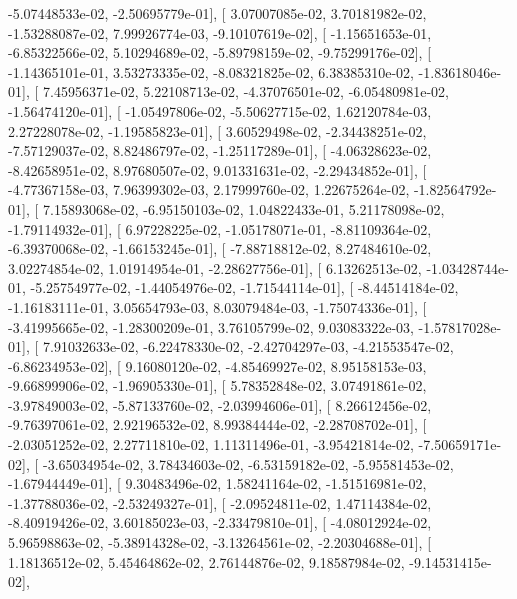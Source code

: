 \documentclass{article}
\begin{document}
         -5.07448533e-02,  -2.50695779e-01],
       [  3.07007085e-02,   3.70181982e-02,  -1.53288087e-02,
          7.99926774e-03,  -9.10107619e-02],
       [ -1.15651653e-01,  -6.85322566e-02,   5.10294689e-02,
         -5.89798159e-02,  -9.75299176e-02],
       [ -1.14365101e-01,   3.53273335e-02,  -8.08321825e-02,
          6.38385310e-02,  -1.83618046e-01],
       [  7.45956371e-02,   5.22108713e-02,  -4.37076501e-02,
         -6.05480981e-02,  -1.56474120e-01],
       [ -1.05497806e-02,  -5.50627715e-02,   1.62120784e-03,
          2.27228078e-02,  -1.19585823e-01],
       [  3.60529498e-02,  -2.34438251e-02,  -7.57129037e-02,
          8.82486797e-02,  -1.25117289e-01],
       [ -4.06328623e-02,  -8.42658951e-02,   8.97680507e-02,
          9.01331631e-02,  -2.29434852e-01],
       [ -4.77367158e-03,   7.96399302e-03,   2.17999760e-02,
          1.22675264e-02,  -1.82564792e-01],
       [  7.15893068e-02,  -6.95150103e-02,   1.04822433e-01,
          5.21178098e-02,  -1.79114932e-01],
       [  6.97228225e-02,  -1.05178071e-01,  -8.81109364e-02,
         -6.39370068e-02,  -1.66153245e-01],
       [ -7.88718812e-02,   8.27484610e-02,   3.02274854e-02,
          1.01914954e-01,  -2.28627756e-01],
       [  6.13262513e-02,  -1.03428744e-01,  -5.25754977e-02,
         -1.44054976e-02,  -1.71544114e-01],
       [ -8.44514184e-02,  -1.16183111e-01,   3.05654793e-03,
          8.03079484e-03,  -1.75074336e-01],
       [ -3.41995665e-02,  -1.28300209e-01,   3.76105799e-02,
          9.03083322e-03,  -1.57817028e-01],
       [  7.91032633e-02,  -6.22478330e-02,  -2.42704297e-03,
         -4.21553547e-02,  -6.86234953e-02],
       [  9.16080120e-02,  -4.85469927e-02,   8.95158153e-03,
         -9.66899906e-02,  -1.96905330e-01],
       [  5.78352848e-02,   3.07491861e-02,  -3.97849003e-02,
         -5.87133760e-02,  -2.03994606e-01],
       [  8.26612456e-02,  -9.76397061e-02,   2.92196532e-02,
          8.99384444e-02,  -2.28708702e-01],
       [ -2.03051252e-02,   2.27711810e-02,   1.11311496e-01,
         -3.95421814e-02,  -7.50659171e-02],
       [ -3.65034954e-02,   3.78434603e-02,  -6.53159182e-02,
         -5.95581453e-02,  -1.67944449e-01],
       [  9.30483496e-02,   1.58241164e-02,  -1.51516981e-02,
         -1.37788036e-02,  -2.53249327e-01],
       [ -2.09524811e-02,   1.47114384e-02,  -8.40919426e-02,
          3.60185023e-03,  -2.33479810e-01],
       [ -4.08012924e-02,   5.96598863e-02,  -5.38914328e-02,
         -3.13264561e-02,  -2.20304688e-01],
       [  1.18136512e-02,   5.45464862e-02,   2.76144876e-02,
          9.18587984e-02,  -9.14531415e-02],
\end{document}
